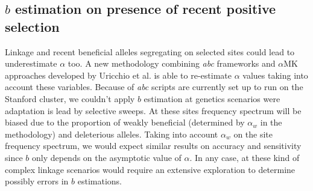 \documentclass[11pt]{article}
\begin{document}
\subsection{$b$  estimation on presence of recent positive selection}

Linkage and recent beneficial alleles segregating on selected sites could lead to underestimate $\alpha$ too. A new methodology combining \emph{abc} frameworks and $\alpha$MK approaches developed by Uricchio et al. is able to re-estimate $\alpha$ values taking into account these variables. Because of \emph{abc} scripts are currently set up to run on the Stanford cluster, we couldn't apply $b$ estimation at genetics scenarios were adaptation is lead by selective sweeps. At these sites frequency spectrum will be biased due to the proportion of weakly beneficial (determined by $\alpha_w$ in the methodology) and deleterious alleles. Taking into account $\alpha_w$ on the site frequency spectrum, we would expect similar results on accuracy and sensitivity since $b$ only depends on the asymptotic value of $\alpha$. In any case, at these kind of complex linkage scenarios would require an extensive exploration to determine possibly errors in $b$ estimations.


    
    
    
\end{document}
